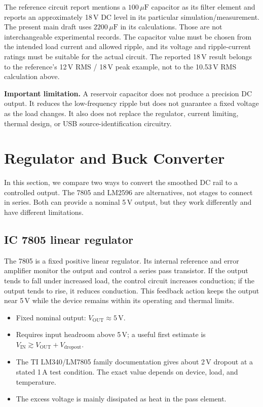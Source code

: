 \documentclass[journal,12pt,twocolumn]{IEEEtran}
\begin{document}
The reference circuit report mentions a $100\,\mu\mathrm{F}$
capacitor as its filter element and reports an approximately
18\,V DC level in its particular simulation/measurement. The
present main draft uses $2200\,\mu\mathrm{F}$ in its calculations.
Those are not interchangeable experimental records. The capacitor
value must be chosen from the intended load current and allowed
ripple, and its voltage and ripple-current ratings must be suitable
for the actual circuit. The reported 18\,V result belongs to the
reference's 12\,V RMS / 18\,V peak example, not to the
10.53\,V RMS calculation above.

\textbf{Important limitation.} A reservoir capacitor does not
produce a precision DC output. It reduces the low-frequency ripple
but does not guarantee a fixed voltage as the load changes. It also
does not replace the regulator, current limiting, thermal design,
or USB source-identification circuitry.

\section{Regulator and Buck Converter}
In this section, we compare two ways to convert the smoothed DC rail
to a controlled output. The 7805 and LM2596 are alternatives, not
stages to connect in series. Both can provide a nominal 5\,V output,
but they work differently and have different limitations.

\subsection{IC 7805 linear regulator}
The 7805 is a fixed positive linear regulator. Its internal reference
and error amplifier monitor the output and control a series pass
transistor. If the output tends to fall under increased load, the
control circuit increases conduction; if the output tends to rise,
it reduces conduction. This feedback action keeps the output near
5\,V while the device remains within its operating and thermal
limits.

\begin{itemize}[leftmargin=1.5em]
    \item Fixed nominal output: $V_{\mathrm{OUT}}\approx5\,\mathrm{V}$.
    \item Requires input headroom above 5\,V; a useful first estimate
    is $V_{\mathrm{IN}}\gtrsim V_{\mathrm{OUT}}+V_{\mathrm{dropout}}$.
    \item The TI LM340/LM7805 family documentation gives about
    2\,V dropout at a stated 1\,A test condition. The exact value
    depends on device, load, and temperature.
    \item The excess voltage is mainly dissipated as heat in the
    pass element.
\end{itemize}
\end{document}

